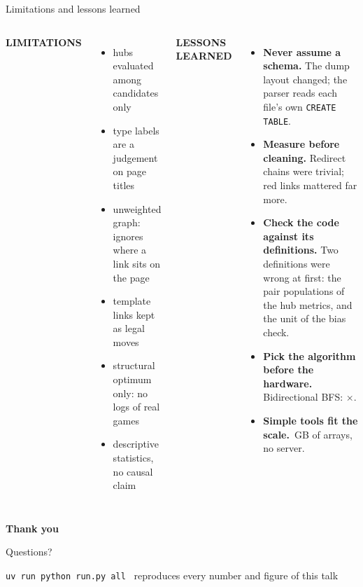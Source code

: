 \documentclass[aspectratio=169,10pt]{beamer}
\newcommand{\kicker}[1]{{\footnotesize\bfseries\color{accent}\MakeUppercase{#1}}\\[2pt]}
\begin{document}
\begin{frame}{Limitations and lessons learned}
\begin{columns}[T,onlytextwidth]
\kicker{Limitations}
\begin{itemize}\small
  \item hubs evaluated among \NCandidates{} candidates only
  \item type labels are a judgement on page titles
  \item unweighted graph: ignores where a link sits on the page
  \item template links kept as legal moves
  \item structural optimum only: no logs of real games
  \item descriptive statistics, no causal claim
\end{itemize}
\kicker{Lessons learned}
\begin{itemize}\small
  \item \textbf{Never assume a schema.} The dump layout changed; the parser reads each file's own \texttt{CREATE TABLE}.
  \item \textbf{Measure before cleaning.} Redirect chains were trivial; red links mattered far more.
  \item \textbf{Check the code against its definitions.} Two definitions were wrong at first: the pair populations of the hub metrics, and the unit of the bias check.
  \item \textbf{Pick the algorithm before the hardware.} Bidirectional BFS: \PairSpeedup$\times$.
  \item \textbf{Simple tools fit the scale.} \CsrDiskGB\,GB of arrays, no server.
\end{itemize}
\end{columns}
\end{frame}

{
\begin{frame}[plain]
\centering
{\color{white}\fontsize{24}{28}\selectfont\bfseries Thank you\par}
\vspace{0.4cm}
{\color{white!70!night}\large Questions?\par}
\vspace{1.0cm}
{\color{white!60!night}\footnotesize\texttt{uv run python run.py all} \ reproduces every number and figure of this talk\par}
\end{frame}}
\end{document}
